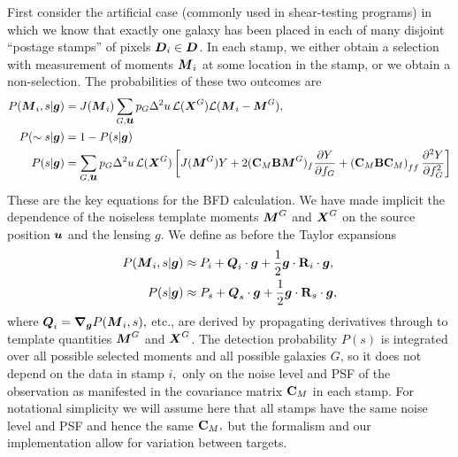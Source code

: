 \documentclass[11pt,preprint,flushrt]{aastex}
\newcommand{\vecD}{\mbox{\boldmath $D$}}
\newcommand{\vecX}{\mbox{\boldmath $X$}}
\newcommand{\vecg}{\mbox{\boldmath $g$}}
\newcommand{\vecM}{\mbox{\boldmath $M$}}
\newcommand{\vecQ}{\mbox{\boldmath $Q$}}
\newcommand{\vecu}{\mbox{\boldmath $u$}}
\newcommand{\matR}{\mbox{$\bf R$}}
\newcommand{\matC}{\mbox{$\bf C$}}
\newcommand{\matB}{\mbox{$\bf B$}}
\newcommand{\bnabg}{\boldsymbol{\nabla_g}}
\newcommand{\likeli}{\mbox{$\mathcal{L}$}}
\newcommand\edit[1]{#1}
\begin{document}
First consider the artificial case (commonly used in shear-testing
programs) in which we know that exactly one galaxy has been placed
in each of many disjoint ``postage stamps'' of pixels $\vecD_i \in
\vecD$.  In each stamp, we either obtain a selection with measurement
of moments $\vecM_i$ at some location in the stamp, or we obtain a
non-selection.  The probabilities of these two outcomes are
\begin{align}
\label{pMs1}
P(\vecM_i, s|\vecg) & = J(\vecM_i) \sum_{G,\vecu}  p_G\Delta^2u\, \likeli(\vecX^G) 
\likeli(\vecM_i-\vecM^G), \\
P(\sim s | \vecg) & = 1 - P(s|\vecg) \\
\label{ps1}
P(s|\vecg) & = \sum_{G,\vecu} p_G \Delta^2u\,\likeli(\vecX^G) \left[
 J(\vecM^G) Y + 2(\matC_M \matB \vecM^G)_f \frac{\partial
  Y}{\partial f_G}
+ \left(\matC_M \matB \matC_M\right)_{ff} 
\frac{\partial^2
  Y}{\partial f_G^2} \right]
\end{align}
These are the key equations for the BFD calculation.  We have made
implicit the dependence of the noiseless template moments $\vecM^G$
and $\vecX^G$ on the source position $\vecu$ and the lensing \vecg.
We define as before the Taylor expansions
\begin{align}
P(\vecM_i,s | \vecg) & \approx P_i + \vecQ_i\cdot \vecg +
  \frac{1}{2}\vecg\cdot\matR_i\cdot\vecg, \\
P(s | \vecg) & \approx P_s + \vecQ_s\cdot \vecg +
  \frac{1}{2}\vecg\cdot\matR_s\cdot\vecg,
\end{align}
where $\vecQ_i=\bnabg P(\vecM_i,s),$ etc., are derived by propagating
derivatives through to template quantities $\vecM^G$ and $\vecX^G$.
\edit{The detection
probability $P(s)$ is integrated over all possible selected
moments and all possible galaxies $G$, so it does not depend on the data in stamp $i,$
only on the noise level and PSF of the observation as manifested in 
the covariance matrix $\matC_M$ in each stamp.}  For
notational simplicity we will assume here that all stamps have the
same noise level and PSF and hence the same $\matC_M,$ but the
formalism and our 
implementation allow for variation between targets.
\end{document}

